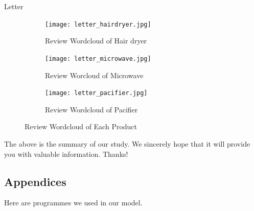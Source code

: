 \documentclass[12pt]{article}  %
\begin{document}
\begin{letter}{Letter}
\begin{figure}[h]
	\centering
	\begin{subfigure}[b]{.32\textwidth}
		\centering
		\texttt{[image: letter\_hairdryer.jpg]}
		\caption{Review Wordcloud of Hair dryer}
	\end{subfigure}
	\begin{subfigure}[b]{.32\textwidth}
		\centering
		\texttt{[image: letter\_microwave.jpg]}
		\caption{Review Worcloud of Microwave}
	\end{subfigure}	
	\begin{subfigure}[b]{.32\textwidth}
		\centering
		\texttt{[image: letter\_pacifier.jpg]}
		\caption{Review Wordcloud of Pacifier}
	\end{subfigure}	
	\caption{Review Wordcloud of Each Product}
	\label{fig:fig16}
\end{figure}


The above is the summary of our study. We sincerely hope that it will provide you with valuable information.
Thanks!

\end{letter}




\begin{subappendices}  %

\section{Appendices}
\noindent Here are programmes we used in our model.









\end{subappendices}
\end{document}
